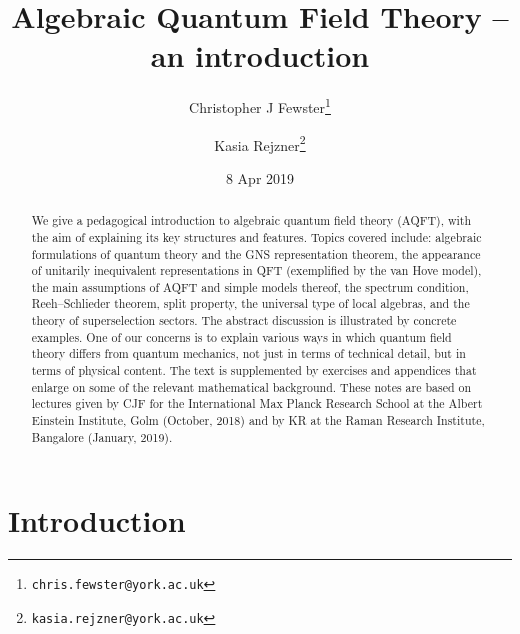 \documentclass[12pt,a4paper]{article}
\newcommand{\1}{\mathds{1}}                         %
\begin{document}
	\title{Algebraic Quantum Field Theory -- an introduction} 
	
	
	\author[1]{Christopher J Fewster\thanks{\tt chris.fewster@york.ac.uk}}
	\author[1]{Kasia Rejzner\thanks{\tt kasia.rejzner@york.ac.uk}}
 
	\date{8 Apr 2019}%
	\maketitle 
	\begin{abstract}  
	We give a pedagogical introduction to algebraic quantum field theory (AQFT), with the aim of explaining its key structures and features. Topics covered include: algebraic formulations of quantum theory and the GNS representation theorem, the appearance of unitarily inequivalent representations in QFT (exemplified by the van Hove model), the main assumptions of AQFT and simple models thereof, the spectrum condition, Reeh--Schlieder theorem, split property, the universal type of local algebras, and the theory of superselection sectors. The abstract discussion is illustrated by concrete examples. One of our concerns is to explain various ways in which quantum field theory differs from quantum mechanics, not just in terms of technical detail, but in terms of physical content. 
	The text is supplemented by exercises and appendices that enlarge on some of the relevant mathematical background. These notes are based on lectures given by CJF for the International Max Planck Research School at the Albert Einstein Institute, Golm (October, 2018) and by KR at the Raman Research Institute, Bangalore (January, 2019). 
	\end{abstract} 
	\tableofcontents 
	
	\section{Introduction}
		
\end{document}
